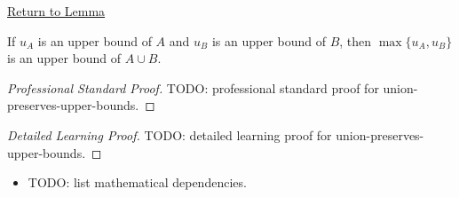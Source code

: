\newpage
{}
\label{prf:union-preserves-upper-bounds}

\begin{remark*}[Return]
\hyperref[lem:union-preserves-upper-bounds]{Return to Lemma}
\end{remark*}

\begin{lemma*}
If $u_A$ is an upper bound of $A$ and $u_B$ is an upper bound of $B$, then
$\max\{u_A,u_B\}$ is an upper bound of $A\cup B$.
\end{lemma*}

\begin{proof}[Professional Standard Proof]
\LRAProofBodyStart
TODO: professional standard proof for union-preserves-upper-bounds.
\end{proof}

\begin{proof}[Detailed Learning Proof]
\LRAProofBodyStart
TODO: detailed learning proof for union-preserves-upper-bounds.
\end{proof}

\begin{remark*}
\end{remark*}

\begin{dependencies}
\begin{itemize}
  \item TODO: list mathematical dependencies.
\end{itemize}
\end{dependencies}

\clearpage

